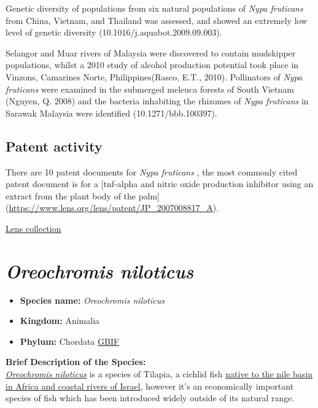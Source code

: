 \documentclass[]{book}
\providecommand{\tightlist}{%
  \setlength{\itemsep}{0pt}\setlength{\parskip}{0pt}}
\theoremstyle{definition}
\theoremstyle{definition}
\theoremstyle{definition}
\theoremstyle{remark}
\begin{document}
Genetic diversity of populations from six natural populations of
\emph{Nypa fruticans} from China, Vietnam, and Thailand was assessed,
and showed an extremely low level of genetic diversity
(10.1016/j.aquabot.2009.09.003).

Selangor and Muar rivers of Malaysia were discovered to contain
mudskipper populations, whilst a 2010 study of alcohol production
potential took place in Vinzons, Camarines Norte, Philippines(Rasco,
E.T., 2010). Pollinators of \emph{Nypa fruticans} were examined in the
submerged meleuca forests of South Vietnam (Nguyen, Q. 2008) and the
bacteria inhabiting the rhizomes of \emph{Nypa fruticans} in Sarawak
Malaysia were identified (10.1271/bbb.100397).

\hypertarget{patent-activity-4}{%
\subsection{Patent activity}\label{patent-activity-4}}

There are 10 patent documents for \emph{Nypa fruticans} , the most
commonly cited patent document is for a {[}tnf-alpha and nitric oxide
production inhibitor using an extract from the plant body of the palm{]}
(\url{https://www.lens.org/lens/patent/JP_2007008817_A}).

\href{https://www.lens.org/lens/collection/24939}{Lens collection}

\hypertarget{oreochromis-niloticus}{%
\section{\texorpdfstring{\emph{Oreochromis
niloticus}}{Oreochromis niloticus}}\label{oreochromis-niloticus}}

\begin{itemize}
\tightlist
\item
  \textbf{Species name:} \emph{Oreochromis niloticus}
\item
  \textbf{Kingdom:} Animalia\\
\item
  \textbf{Phylum:} Chordata
  \href{https://www.gbif.org/species/4285694}{GBIF}
\end{itemize}

\textbf{Brief Description of the Species:}\\
\href{http://eol.org/pages/356343/overview}{\emph{Oreochromis
niloticus}} is a species of Tilapia, a cichlid fish
\href{http://eol.org/pages/356343/data?toc_id=4\#1448}{native to the
nile basin in Africa and coastal rivers of Israel}, however it's an
economically important species of fish which has been introduced widely
outside of its natural range.
\end{document}
